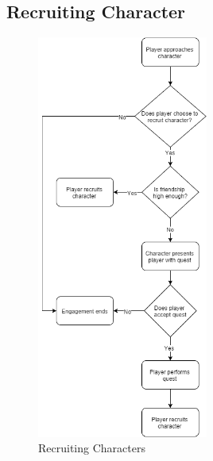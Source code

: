 \subsection{Recruiting Character}
\begin{figure}[H]
\centering\includegraphics[width=0.5\textwidth, height=0.8\paperheight, keepaspectratio=true]{images/Recruit}
  \caption{Recruiting Characters}
  \label{fig:flow_recruit}
\end{figure}

